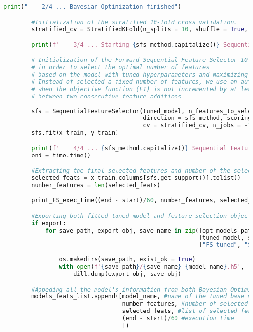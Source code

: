 \begin{lstlisting}[language=Python, basicstyle=\footnotesize\ttfamily]
        print("    2/4 ... Bayesian Optimization finished")

        #Initialization of the stratified 10-fold cross validation.
        stratified_cv = StratifiedKFold(n_splits = 10, shuffle = True, random_state = seed)

        print(f"    3/4 ... Starting {sfs_method.capitalize()} Sequential Feature Selection")

        # Initialization of the Forward Sequential Feature Selector 10-fold Cross Validation
        # in order to select the optimal number of features
        # based on the model with tuned hyperparameters and maximizing F1 score function.
        # Instead of selected a fixed number of features, we use an auto selection which stops adding features 
        # when the objective function (F1) is not incremented by at least "tol"
        # between two consecutive feature additions.
                
        sfs = SequentialFeatureSelector(tuned_model, n_features_to_select = "auto",
                                        direction = sfs_method, scoring = objective_function,
                                        cv = stratified_cv, n_jobs = -1, tol = 0.0000000000000000001)
        sfs.fit(x_train, y_train)

        print(f"    4/4 ... {sfs_method.capitalize()} Sequential Feature Selection with finished", "\n")
        end = time.time()

        #Extracting the final selected features and number of the selected features.
        selected_feats = x_train.columns[sfs.get_support()].tolist()
        number_features = len(selected_feats)

        print_FS_exec_time((end - start)/60, number_features, selected_feats, dashes)

        #Exporting both fitted tuned model and feature selection object.
        if export:
            for save_path, export_obj, save_name in zip([opt_models_path, feat_select_path],
                                                        [tuned_model, sfs],
                                                        ["FS_tuned", "SFS_with"]):
        
                os.makedirs(save_path, exist_ok = True)
                with open(f'{save_path}/{save_name}_{model_name}.h5', "wb") as save_obj:
                    dill.dump(export_obj, save_obj)

        #Appeding all the model's information from both Bayesian Optimization an Sequential Feature Selection.
        models_feats_list.append([model_name, #name of the tuned base model
                                  number_features, #number of selected features
                                  selected_feats, #list of selected features' names
                                  (end - start)/60 #execution time
                                  ])


\end{lstlisting}
